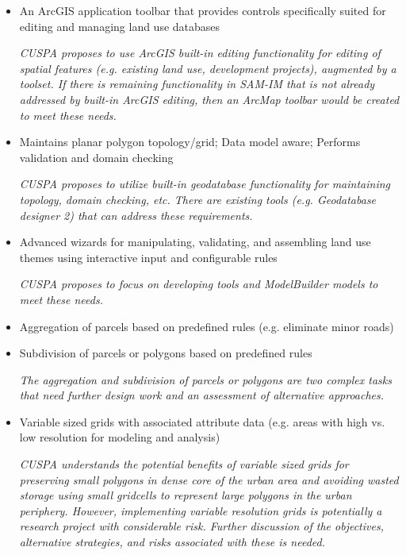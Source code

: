 \begin{itemize}

\item An ArcGIS application toolbar that provides controls specifically suited for editing and managing land use databases

\emph{CUSPA proposes to use ArcGIS built-in editing functionality for editing of spatial features (e.g. existing land use, development projects), augmented by a toolset.  If there is remaining functionality in SAM-IM that is not already addressed by built-in ArcGIS editing, then an ArcMap toolbar would be created to meet these needs.}

\item Maintains planar polygon topology/grid; Data model aware; Performs validation and domain checking

\emph{CUSPA proposes to utilize built-in geodatabase functionality for maintaining topology, domain checking, etc.  There are existing tools (e.g. Geodatabase designer 2) that can address these requirements.}

\item Advanced wizards for manipulating, validating, and assembling land use themes using interactive input and configurable rules

\emph{CUSPA proposes to focus on developing tools and ModelBuilder models to meet these needs.}

\item Aggregation of parcels based on predefined rules (e.g. eliminate minor roads)

\item Subdivision of parcels or polygons based on predefined rules

\emph{The aggregation and subdivision of parcels or polygons are two complex tasks that need further design work and an assessment of alternative approaches.}

\item Variable sized grids with associated attribute data (e.g. areas with high vs. low resolution for modeling and analysis)

\emph{CUSPA understands the potential benefits of variable sized grids for preserving small polygons in dense core of the urban area and avoiding wasted storage using small gridcells to represent large polygons in the urban periphery.  However, implementing variable resolution grids is potentially a research project with considerable risk.  Further discussion of the objectives, alternative strategies, and risks associated with these is needed.}


\end{itemize}

